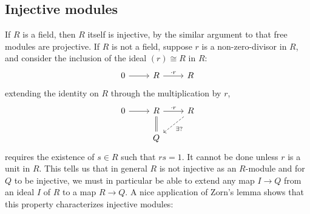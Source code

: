 \subsection{Injective modules}
If $R$ is a field, then $R$ itself is injective, by the similar argument to that free modules are projective. If $R$ is not a field, suppose $r$ is a non-zero-divisor in $R$, and consider the inclusion of the ideal $(r)\cong R$ in $R$:
\[\begin{tikzcd}
0\ar[r]&R\ar[r,"\cdot r"]&R
\end{tikzcd}\]
extending the identity on $R$ through the multiplication by $r$,
\[\begin{tikzcd}
0\ar[r]&R\ar[d,equal]\ar[r,"\cdot r"]&R\ar[ld,swap,dashed,swap,"\exists?"]\\
&Q
\end{tikzcd}\]
requires the existence of $s\in R$ such that $rs=1$. It cannot be done unless $r$ is a unit in $R$. This tells us that in general $R$ is not injective as an $R$-module and for $Q$ to be injective, we must in particular be able to extend any map $I\to Q$ from an ideal $I$ of $R$ to a map $R\to Q$. A nice application of Zorn's lemma shows that this property characterizes injective modules:
